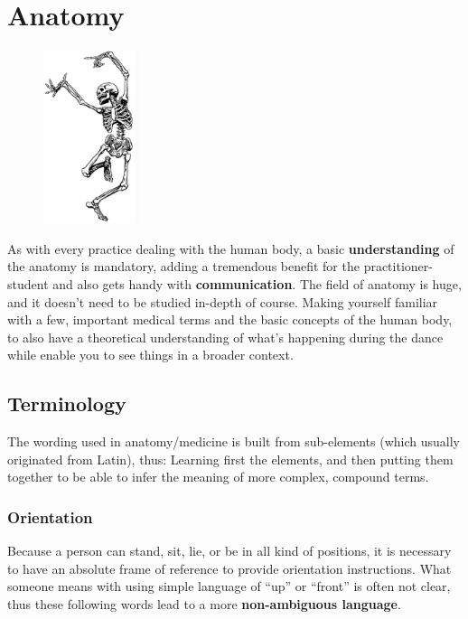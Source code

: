 \section{Anatomy}\label{sec:anatomy}

\begin{figure}
    \centering
    \includegraphics[width=0.25\textwidth]{images/anatomy}
\end{figure}

As with every practice dealing with the human body, a basic \textbf{understanding} of the anatomy is mandatory, adding a tremendous benefit for the practitioner-student and also gets handy with \textbf{communication}.
The field of anatomy is huge, and it doesn't need to be studied in-depth of course.
Making yourself familiar with a few, important medical terms and the basic concepts of the human body, to also have a theoretical understanding of what's happening during the dance while enable you to see things in a broader context.

\subsection{Terminology}\label{subsec:terminology}

The wording used in anatomy/medicine is built from sub-elements (which usually originated from Latin), thus:
Learning first the elements, and then putting them together to be able to infer the meaning of more complex, compound terms.

\subsubsection{Orientation}

Because a person can stand, sit, lie, or be in all kind of positions, it is necessary to have an absolute frame of reference to provide orientation instructions.
What someone means with using simple language of ``up'' or ``front'' is often not clear, thus these following words lead to a more \textbf{non-ambiguous language}.

